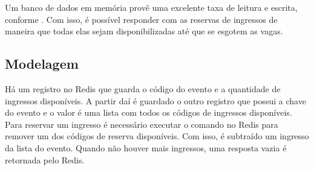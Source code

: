 Um banco de dados em memória provê uma excelente taxa de leitura e escrita, conforme
.
Com isso, é possível responder com as reservas de ingressos de maneira que todas elas
sejam disponibilizadas até que se esgotem as vagas.

\subsection{Modelagem}

Há um registro no Redis que guarda o código do evento e a quantidade de ingressos
disponíveis. A partir daí é guardado o outro registro que possui a chave do evento
e o valor é uma lista com todos os códigos de ingressos disponíveis. Para reservar
um ingresso é necessário executar o comando no Redis para remover um dos códigos
de reserva disponíveis. Com isso, é subtraído um ingresso da lista do evento. Quando
não houver mais ingressos, uma resposta vazia é retornada pelo Redis.
